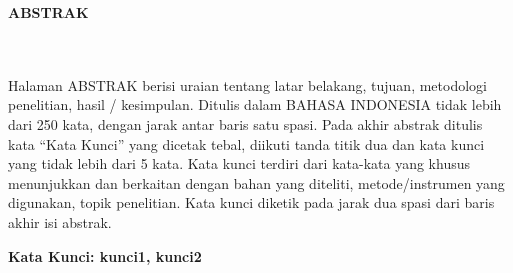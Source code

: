 \clearpage
{}%
\thispagestyle{fancy}

\begin{center}
	\large \bfseries \MakeUppercase{Abstrak}\\
	\normalsize \normalfont {\thetitle}\\
	\normalsize \normalfont {\theauthor}\\
	\bigskip
	
	\normalsize \normalfont \justifying \singlespacing
	Halaman ABSTRAK berisi uraian tentang latar belakang, tujuan, metodologi penelitian, hasil / kesimpulan. Ditulis dalam BAHASA INDONESIA tidak lebih dari 250 kata, dengan jarak antar baris satu spasi. Pada akhir abstrak ditulis kata “Kata Kunci” yang dicetak tebal, diikuti tanda titik dua dan kata kunci yang tidak lebih dari 5 kata. Kata kunci terdiri dari kata-kata yang khusus menunjukkan dan berkaitan dengan bahan yang diteliti, metode/instrumen yang digunakan, topik penelitian. Kata kunci diketik pada jarak dua spasi dari baris akhir isi abstrak.\par

    \vspace{20pt}
	\raggedright \textbf{Kata Kunci: kunci1, kunci2}
	
	\vfill
	
\end{center}
\clearpage